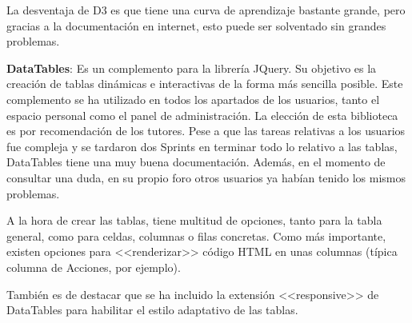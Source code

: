 La desventaja de D3 es que tiene una curva de aprendizaje bastante grande, pero
gracias a la documentación en internet, esto puede ser solventado sin grandes
problemas.

\textbf{DataTables}: Es un complemento para la librería JQuery. Su objetivo es
la creación de tablas dinámicas e interactivas de la forma más sencilla posible.
Este complemento se ha utilizado en todos los apartados de los usuarios, tanto
el espacio personal como el panel de administración. La elección de esta
biblioteca es por recomendación de los tutores. Pese a que las tareas relativas
a los usuarios fue compleja y se tardaron dos Sprints en terminar todo lo
relativo a las tablas, DataTables tiene una muy buena documentación. Además, en
el momento de consultar una duda, en su propio foro otros usuarios ya habían
tenido los mismos problemas.

A la hora de crear las tablas, tiene multitud de opciones, tanto para la tabla
general, como para celdas, columnas o filas concretas. Como más importante,
existen opciones para <<renderizar>> código HTML en unas columnas (típica
columna de Acciones, por ejemplo).

También es de destacar que se ha incluido la extensión <<responsive>> de
DataTables para habilitar el estilo adaptativo de las tablas.